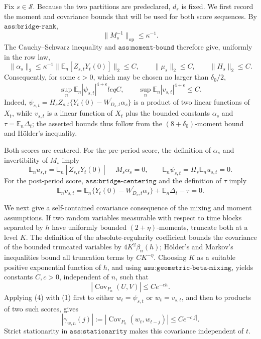 Fix \(s\in\mathcal S\).  Because the two partitions are predeclared, \(d_s\) is fixed.  We first record the moment and covariance bounds that will be used for both score sequences.  By \(\texttt{ass:bridge-rank}\),
\[
 \lVert M_s^{-1}\rVert_{\mathrm{op}}\leq \kappa^{-1}.
\]
The Cauchy--Schwarz inequality and \(\texttt{ass:moment-bound}\) therefore give, uniformly in the row law,
\[
 \lVert\alpha_s\rVert_2
 \leq \kappa^{-1}\lVert\mathbb E_n[Z_{s,t}Y_t(0)]\rVert_2\leq C,
 \qquad
 \lVert\mu_s\rVert_2\leq C,
 \qquad
 \lVert H_s\rVert_2\leq C.
\]
Consequently, for some \(\epsilon>0\), which may be chosen no larger than \(\delta_0/2\),
\[
 \sup_n\mathbb E_n|\psi_{s,t}|^{4+\epsilon}leq C,
 \qquad
 \sup_n\mathbb E_n|v_{s,t}|^{4+\epsilon}\leq C.                                      \tag{1}
\]
Indeed, \(\psi_{s,t}=H_sZ_{s,t}\{Y_t(0)-W_{D_s,t}^{\prime}\alpha_s\}\) is a product of two linear functions of \(X_t\), while \(v_{s,t}\) is a linear function of \(X_t\) plus the bounded constants \(\alpha_s\) and \(\tau=\mathbb E_n\Delta_t\); the asserted bounds thus follow from the \((8+\delta_0)\)-moment bound and H\"older's inequality.

Both scores are centered.  For the pre-period score, the definition of \(\alpha_s\) and invertibility of \(M_s\) imply
\[
 \mathbb E_n u_{s,t}
 =\mathbb E_n[Z_{s,t}Y_t(0)]-M_s\alpha_s=0,
 \qquad
 \mathbb E_n\psi_{s,t}=H_s\mathbb E_nu_{s,t}=0.                                    \tag{2}
\]
For the post-period score, \(\texttt{ass:bridge-centering}\) and the definition of \(\tau\) imply
\[
 \mathbb E_nv_{s,t}
 =\mathbb E_n\{Y_t(0)-W_{D_s,t}^{\prime}\alpha_s\}
  +\mathbb E_n\Delta_t-\tau=0.                                                       \tag{3}
\]

We next give a self-contained covariance consequence of the mixing and moment assumptions.  If two random variables measurable with respect to time blocks separated by \(h\) have uniformly bounded \((2+\eta)\)-moments, truncate both at a level \(K\).  The definition of the absolute-regularity coefficient bounds the covariance of the bounded truncated variables by \(4K^2\beta_n(h)\); H\"older's and Markov's inequalities bound all truncation terms by \(CK^{-\eta}\).  Choosing \(K\) as a suitable positive exponential function of \(h\), and using \(\texttt{ass:geometric-beta-mixing}\), yields constants \(C,c>0\), independent of \(n\), such that
\[
 |\operatorname{Cov}_{P_n}(U,V)|\leq Ce^{-ch}.                                      \tag{4}
\]
Applying (4) with (1) first to either \(w_t=\psi_{s,t}\) or \(w_t=v_{s,t}\), and then to products of two such scores, gives
\[
 |\gamma_{w,n}(j)|
 :=|\operatorname{Cov}_{P_n}(w_t,w_{t-j})|\leq Ce^{-c|j|}.                           \tag{5}
\]
Strict stationarity in \(\texttt{ass:stationarity}\) makes this covariance independent of \(t\).

